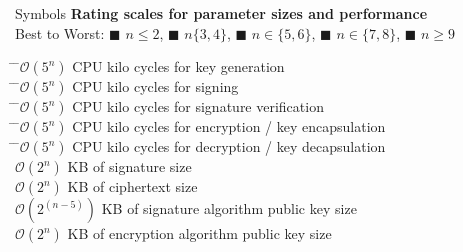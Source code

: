 \begin{minipage}[t]{0.4\textwidth}
\begin{algorithmbox}{Symbols}
        {\bfseries Rating scales for parameter sizes and performance}\\[0.5\baselineskip]
        Best to Worst: \textcolor{themegreen}{$\blacksquare$} $n\leq2$, \textcolor{themeyellow}{$\blacksquare$} $n\{3,4\}$, \textcolor{themeorange}{$\blacksquare$} $n\in\{5,6\}$, \textcolor{themered}{$\blacksquare$} $n\in\{7,8\}$, \textcolor{themered!65!black}{$\blacksquare$} $n\geq9$
        \begin{tabbing}
            \=
            \=$\mathcal{O}(5^n)$ CPU kilo cycles for key generation\\
            \=
            \=$\mathcal{O}(5^n)$ CPU kilo cycles for signing\\
            \=
            \=$\mathcal{O}(5^n)$ CPU kilo cycles for signature verification\\
            \=
            \=$\mathcal{O}(5^n)$ CPU kilo cycles for encryption / key encapsulation\\
            \=
            \=$\mathcal{O}(5^n)$ CPU kilo cycles for decryption / key decapsulation\\
            \>
            \>$\mathcal{O}(2^n)$ KB of signature size\\
            \>
            \> $\mathcal{O}(2^n)$ KB of ciphertext size\\
            \>
            \> $\mathcal{O}(2^{(n-5)})$ KB of signature algorithm public key size\\
            \>
            \> $\mathcal{O}(2^n)$ KB of encryption algorithm public key size\\
        \end{tabbing}
        \vspace{-6mm}
    \end{algorithmbox}
\end{minipage}
\hfill
